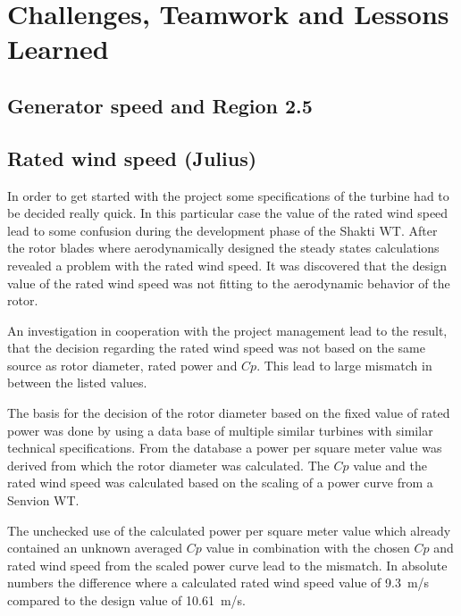 \chapter{Challenges, Teamwork and Lessons Learned}

\section{Generator speed and Region 2.5}

\section{Rated wind speed (Julius)}
In order to get started with the project some specifications of the turbine had to be decided really quick.
In this particular case the value of the rated wind speed lead to some confusion during the development phase of the Shakti WT.
After the rotor blades where aerodynamically designed the steady states calculations revealed a problem with the rated wind speed.
It was discovered that the design value of the rated wind speed was not fitting to the aerodynamic behavior of the rotor.

An investigation in cooperation with the project management lead to the result, that the decision regarding the rated wind speed was not based on the same source as rotor diameter, rated power and $Cp$.
This lead to large mismatch in between the listed values.

The basis for the decision of the rotor diameter based on the fixed value of rated power was done by using a data base of multiple similar turbines with similar technical specifications.
From the database a power per square meter value was derived from which the rotor diameter was calculated.
The $Cp$ value and the rated wind speed was calculated based on the scaling of a power curve from a Senvion WT.

The unchecked use of the calculated power per square meter value which already contained an unknown averaged $Cp$ value in combination with the chosen $Cp$ and rated wind speed from the scaled power curve lead to the mismatch. In absolute numbers the difference where a calculated rated wind speed value of \SI{9.3}{m/s} compared to the design value of \SI{10.61}{m/s}.

